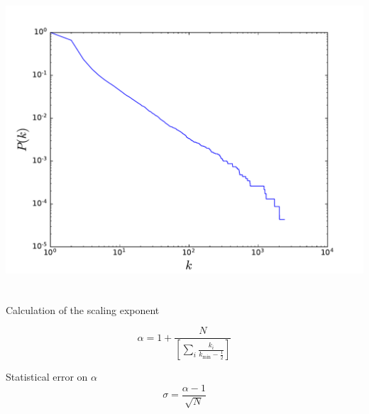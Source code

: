\documentclass{beamer}
\begin{document}
\begin{frame}
\begin{columns}
        \includegraphics[width=\columnwidth]{internet_loglog_cum_hist2.pdf}
    \end{columns}
\end{frame}
\begin{frame}
    \frametitle{}
    Calculation of the scaling exponent
    
    \centering
    $$\alpha = 1 + \frac{N}{\left[\sum\limits_i\frac{k_i}{k_{\text{min}}-\frac{1}{2}}\right]}$$

    \justifying
    Statistical error on $\alpha$
    $$\sigma = \frac{\alpha-1}{\sqrt{N}}$$
\end{frame}
\end{document}
